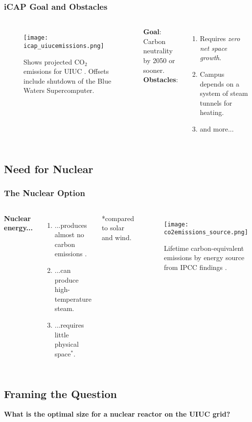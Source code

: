 \begin{frame}
  \frametitle{iCAP Goal and Obstacles}
  \begin{columns}
    \column[t]{5cm}
    \begin{figure}
      \centering
      \texttt{[image: icap\_uiucemissions.png]}
      \caption{Shows projected CO$_2$ emissions for UIUC \cite{isee_illinois_2015}. Offsets include shutdown of the Blue Waters Supercomputer.}
      \label{fig:co2projections}
    \end{figure}

    \column[t]{5cm}
    \textbf{Goal}:\\
    Carbon neutrality by 2050 or sooner.\\
    \vspace{1cm}
    \textbf{Obstacles}:\\
    \begin{enumerate}
      \item Requires \textit{zero net space growth}.
      \item Campus depends on a system of steam tunnels for heating.
      \item and more...
    \end{enumerate}
  \end{columns}
\end{frame}

\subsection{Need for Nuclear}
\begin{frame}
  \frametitle{The Nuclear Option}
  \begin{columns}
    \vspace{0.25cm}
    \column[t]{5cm}
      \textbf{Nuclear energy...}
      \vspace{0.25cm}
      \begin{enumerate}
        \item ...produces almost no carbon emissions \cite{intergovernmental_panel_on_climate_change_climate_2014}.
        \item ...can produce high-temperature steam.
        \item ...requires little physical space$^*$.
      \end{enumerate}
      \vspace{3cm}
      *compared to solar and wind.
    \column[t]{5cm}
    \begin{figure}
      \texttt{[image: co2emissions\_source.png]}
      \caption{Lifetime carbon-equivalent emissions by energy source from IPCC findings \cite{intergovernmental_panel_on_climate_change_climate_2014}.}
      \label{fig:co2source}
    \end{figure}
  \end{columns}
\end{frame}

\subsection{Framing the Question}
\begin{frame}
  \begin{center}
    \Huge{\textbf{What is the optimal size for a nuclear reactor on the UIUC grid?}}
  \end{center}
\end{frame}
